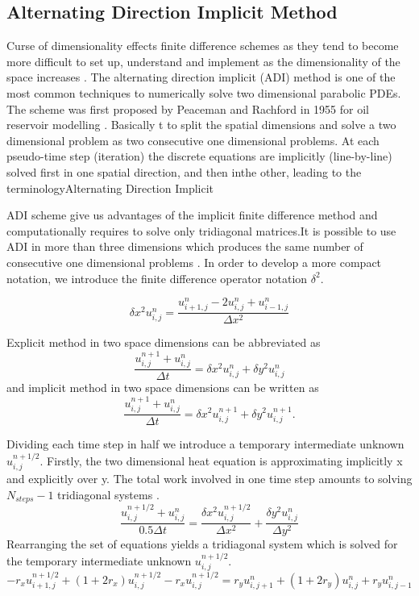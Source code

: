 \documentclass[12pt, oneside]{book}
\theoremstyle{plain}
\theoremstyle{definition}
\begin{document}
\subsection{Alternating Direction Implicit Method}
Curse of dimensionality effects finite difference schemes as they tend to become more difficult to set up, understand and implement as the dimensionality of the space increases \cite{duffyfinite}. The alternating direction implicit (ADI) method is one of the most common techniques to numerically solve two dimensional parabolic PDEs. The scheme was first proposed by Peaceman and Rachford in 1955 for oil reservoir modelling \cite{peace}. Basically t to split the spatial dimensions and solve a two dimensional problem as two consecutive one dimensional problems. 
At each pseudo-time step (iteration) the discrete equations are implicitly (line-by-line) solved first in one spatial direction, and then inthe other, leading to the terminologyAlternating Direction Implicit

ADI scheme give us advantages of the implicit finite difference method and computationally requires to solve only tridiagonal matrices.It is possible to use ADI in more than three dimensions which produces the same number of consecutive one dimensional problems \cite{DougADI}. In order to develop a more compact notation, we introduce the finite difference operator notation $\delta^2$.

\begin{equation}
\delta x^2 u^{n}_{i,j}  = \frac{u^{n}_{i+1,j} - 2u^{n}_{i,j} + u^{n}_{i-1,j}}{\Delta x^2}
\end{equation}

Explicit method in two space dimensions can be abbreviated as
\begin{equation}
\frac{u^{n+1}_{i,j} + u^{n}_{i,j}}{\Delta t} = \delta x^2 u^{n}_{i,j} + \delta y^2 u^{n}_{i,j}
\end{equation}
and implicit method in two space dimensions can be written as
\begin{equation}
\frac{u^{n+1}_{i,j} + u^{n}_{i,j}}{\Delta t} = \delta x^2 u^{n+1}_{i,j} + \delta y^2 u^{n+1}_{i,j} .
\end{equation}

Dividing each time step in half we introduce a temporary intermediate unknown $u^{n+1/2}_{i,j}$. Firstly, the two dimensional heat equation is approximating implicitly x and explicitly over y. The total work involved in one time step amounts to solving $ N_{steps} - 1$ tridiagonal systems \cite{morton}. 
\begin{equation}
\frac{u^{n+1/2}_{i,j} + u^{n}_{i,j}}{0.5 \Delta t} = \frac{\delta x^2 u^{n+1/2}_{i,j} }{\Delta x^2} + \frac{\delta y^2 u^{n}_{i,j}}{\Delta y^2}
\end{equation}
Rearranging the set of equations yields a tridiagonal system which is solved for the temporary intermediate unknown $u^{n+1/2}_{i,j}$.
\begin{equation}
- r_x u^{n+1/2}_{i+1,j} + (1 + 2r_x) u^{n+1/2}_{i,j}  - r_x u^{n+1/2}_{i,j}  = r_y u^{n}_{i,j+1} + (1 + 2r_y) u^{n}_{i,j} + r_y u^{n}_{i,j-1}
\end{equation}
\end{document}
